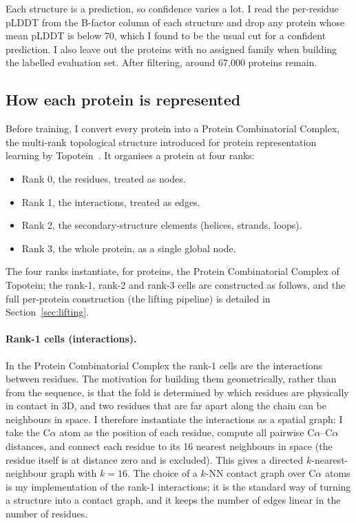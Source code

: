 \documentclass[11pt,a4paper]{article}
\theoremstyle{definition}
\begin{document}
Each structure is a prediction, so confidence varies a lot. I read the
per-residue pLDDT from the B-factor column of each structure and drop any protein
whose mean pLDDT is below 70, which I found to be the usual cut for a confident
prediction. I also leave out the proteins with no assigned family when building
the labelled evaluation set. After filtering, around 67,000 proteins remain.

\subsection{How each protein is represented}

Before training, I convert every protein into a Protein Combinatorial Complex,
the multi-rank topological structure introduced for protein representation
learning by Topotein~\cite{topotein}. It organises a protein at four ranks:

\begin{itemize}[leftmargin=1.4em,itemsep=2pt]
  \item Rank 0, the residues, treated as nodes.
  \item Rank 1, the interactions, treated as edges.
  \item Rank 2, the secondary-structure elements (helices, strands, loops).
  \item Rank 3, the whole protein, as a single global node.
\end{itemize}

The four ranks instantiate, for proteins, the Protein Combinatorial Complex of
Topotein; the rank-1, rank-2 and rank-3 cells are constructed as follows, and the
full per-protein construction (the lifting pipeline) is detailed in
Section~\ref{sec:lifting}.

\paragraph{Rank-1 cells (interactions).} In the Protein Combinatorial Complex the
rank-1 cells are the interactions between residues. The motivation for building
them geometrically, rather than from the sequence, is that the fold is determined
by which residues are physically in contact in 3D, and two residues that are far
apart along the chain can be neighbours in space. I therefore instantiate the
interactions as a spatial graph: I take the C$\alpha$ atom as the position of each
residue, compute all pairwise C$\alpha$--C$\alpha$ distances, and connect each
residue to its 16 nearest neighbours in space (the residue itself is at distance
zero and is excluded). This gives a directed $k$-nearest-neighbour graph with
$k=16$. The choice of a $k$-NN contact graph over C$\alpha$ atoms is my
implementation of the rank-1 interactions; it is the standard way of turning a
structure into a contact graph, and it keeps the number of edges linear in the
number of residues.
\end{document}
